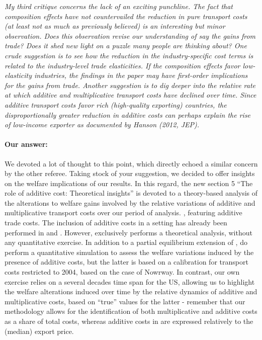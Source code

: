 \documentclass[a4paper,11pt]{article}
\begin{document}
\textit{My third critique concerns the lack of an exciting punchline. The fact that
composition effects have not countervailed the reduction in pure transport costs
(at least not as much as previously believed) is an interesting but minor observation.
Does this observation revise our understanding of say the gains from
trade? Does it shed new light on a puzzle many people are thinking about?
One crude suggestion is to see how the reduction in the industry-specific cost
terms is related to the industry-level trade elasticities. If the composition effects
favor low-elasticity industries, the findings in the paper may have first-order
implications for the gains from trade.
Another suggestion is to dig deeper into the relative rate at which additive
and multiplicative transport costs have declined over time. Since additive transport
costs favor rich (high-quality exporting) countries, the disproportionally
greater reduction in additive costs can perhaps explain the rise of low-income
exporter as documented by Hanson (2012, JEP).}

\paragraph{Our answer:}
\noindent We devoted a lot of thought to this point, which directly echoed a similar concern by the other referee. Taking stock of your suggestion, we decided to offer insights on the welfare implications of our results. In this regard,%
the new section 5 ``The role of additive cost: Theoretical insights'' is devoted to a theory-based analysis of the alterations to welfare gains involved by the relative variations of additive and multiplicative transport costs over our period of analysis. \citet{melitz}, featuring additive trade costs. The inclusion of additive costs in a \citet{melitz} setting has already been performed in \citet{sorensen2014} and \citet{Irrazabal_2015}. However, \citet{sorensen2014} exclusively performs a theoretical analysis, without any quantitative exercise. In addition to a partial equilibrium extension of \citet{melitz}, \citet{Irrazabal_2015} do perform a quantitative simulation to assess the welfare variations induced by the presence of additive costs, but the latter is based on a calibration for transport costs restricted to 2004, based on the case of Nowrway. In contrast, our own exercise relies on a several decades time span for the US, allowing us to highlight the welfare alterations induced over time by the relative dynamics of additive and multiplicative costs, based on ``true'' values for the latter - remember that our methodology allows for the identification of both multiplicative and additive costs as a share of total costs, whereas additive costs in \citet{Irrazabal_2015} are expressed relatively to the (median) export price.
\end{document}
